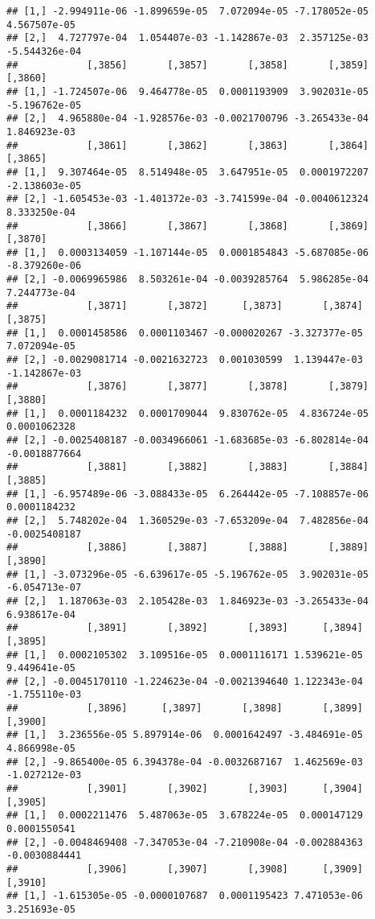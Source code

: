 \documentclass[
]{article}
\begin{document}
\begin{verbatim}
## [1,] -2.994911e-06 -1.899659e-05  7.072094e-05 -7.178052e-05  4.567507e-05
## [2,]  4.727797e-04  1.054407e-03 -1.142867e-03  2.357125e-03 -5.544326e-04
##            [,3856]       [,3857]       [,3858]       [,3859]       [,3860]
## [1,] -1.724507e-06  9.464778e-05  0.0001193909  3.902031e-05 -5.196762e-05
## [2,]  4.965880e-04 -1.928576e-03 -0.0021700796 -3.265433e-04  1.846923e-03
##            [,3861]       [,3862]       [,3863]       [,3864]       [,3865]
## [1,]  9.307464e-05  8.514948e-05  3.647951e-05  0.0001972207 -2.138603e-05
## [2,] -1.605453e-03 -1.401372e-03 -3.741599e-04 -0.0040612324  8.333250e-04
##            [,3866]       [,3867]       [,3868]       [,3869]       [,3870]
## [1,]  0.0003134059 -1.107144e-05  0.0001854843 -5.687085e-06 -8.379260e-06
## [2,] -0.0069965986  8.503261e-04 -0.0039285764  5.986285e-04  7.244773e-04
##            [,3871]       [,3872]      [,3873]       [,3874]       [,3875]
## [1,]  0.0001458586  0.0001103467 -0.000020267 -3.327377e-05  7.072094e-05
## [2,] -0.0029081714 -0.0021632723  0.001030599  1.139447e-03 -1.142867e-03
##            [,3876]       [,3877]       [,3878]       [,3879]       [,3880]
## [1,]  0.0001184232  0.0001709044  9.830762e-05  4.836724e-05  0.0001062328
## [2,] -0.0025408187 -0.0034966061 -1.683685e-03 -6.802814e-04 -0.0018877664
##            [,3881]       [,3882]       [,3883]       [,3884]       [,3885]
## [1,] -6.957489e-06 -3.088433e-05  6.264442e-05 -7.108857e-06  0.0001184232
## [2,]  5.748202e-04  1.360529e-03 -7.653209e-04  7.482856e-04 -0.0025408187
##            [,3886]       [,3887]       [,3888]       [,3889]       [,3890]
## [1,] -3.073296e-05 -6.639617e-05 -5.196762e-05  3.902031e-05 -6.054713e-07
## [2,]  1.187063e-03  2.105428e-03  1.846923e-03 -3.265433e-04  6.938617e-04
##            [,3891]       [,3892]       [,3893]      [,3894]       [,3895]
## [1,]  0.0002105302  3.109516e-05  0.0001116171 1.539621e-05  9.449641e-05
## [2,] -0.0045170110 -1.224623e-04 -0.0021394640 1.122343e-04 -1.755110e-03
##            [,3896]      [,3897]       [,3898]       [,3899]       [,3900]
## [1,]  3.236556e-05 5.897914e-06  0.0001642497 -3.484691e-05  4.866998e-05
## [2,] -9.865400e-05 6.394378e-04 -0.0032687167  1.462569e-03 -1.027212e-03
##            [,3901]       [,3902]       [,3903]      [,3904]       [,3905]
## [1,]  0.0002211476  5.487063e-05  3.678224e-05  0.000147129  0.0001550541
## [2,] -0.0048469408 -7.347053e-04 -7.210908e-04 -0.002884363 -0.0030884441
##            [,3906]       [,3907]       [,3908]      [,3909]       [,3910]
## [1,] -1.615305e-05 -0.0000107687  0.0001195423 7.471053e-06  3.251693e-05

\end{verbatim}
\end{document}

